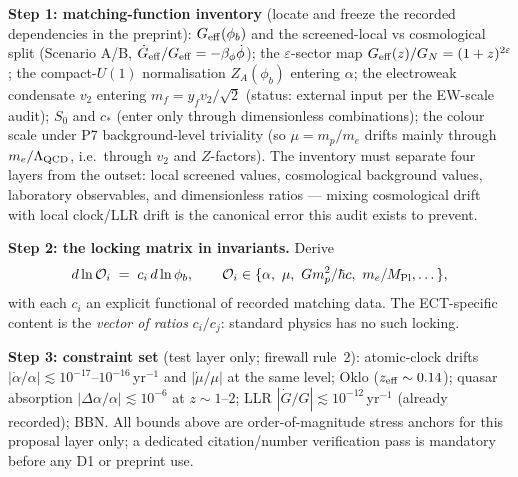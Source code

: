 \documentclass[11pt,a4paper]{article}
\begin{document}
\textbf{Step 1: matching-function inventory} (locate and freeze the recorded
dependencies in the preprint): $G_{\rm eff}(\phi_b)$ and the screened-local vs
cosmological split (Scenario A/B, $\dot G_{\rm eff}/G_{\rm eff}=-\beta_\phi\dot\phi$);
the $\varepsilon$-sector map $G_{\rm eff}(z)/G_N=(1+z)^{2\varepsilon}$; the
compact-$U(1)$ normalisation $Z_A(\phi_b)$ entering $\alpha$; the electroweak
condensate $v_2$ entering $m_f=y_f v_2/\sqrt2$ (status: external input per the
EW-scale audit); $S_0$ and $c_*$ (enter only through dimensionless combinations);
the colour scale under P7 background-level triviality (so $\mu=m_p/m_e$ drifts mainly
through $m_e/\Lambda_{\rm QCD}$, i.e.\ through $v_2$ and $Z$-factors).
The inventory must separate four layers from the outset: local screened values,
cosmological background values, laboratory observables, and dimensionless ratios ---
mixing cosmological drift with local clock/LLR drift is the canonical error this
audit exists to prevent.

\textbf{Step 2: the locking matrix in invariants.} Derive
\[
d\ln\mathcal O_i \;=\; c_i\, d\ln\phi_b,\qquad
\mathcal O_i\in\{\alpha,\ \mu,\ G m_p^2/\hbar c,\ m_e/M_{\rm Pl},\dots\},
\]
with each $c_i$ an explicit functional of recorded matching data. The ECT-specific
content is the \emph{vector of ratios} $c_i/c_j$: standard physics has no such
locking.

\textbf{Step 3: constraint set} (test layer only; firewall rule~2):
atomic-clock drifts $|\dot\alpha/\alpha|\lesssim10^{-17}\text{--}10^{-16}$\,yr$^{-1}$
and $|\dot\mu/\mu|$ at the same level; Oklo ($z_{\rm eff}\sim0.14$); quasar absorption
$|\Delta\alpha/\alpha|\lesssim10^{-6}$ at $z\sim1$--$2$; LLR
$|\dot G/G|\lesssim10^{-12}$\,yr$^{-1}$ (already recorded); BBN.
All bounds above are order-of-magnitude stress anchors for this proposal layer only;
a dedicated citation/number verification pass is mandatory before any D1 or preprint
use.
\end{document}
